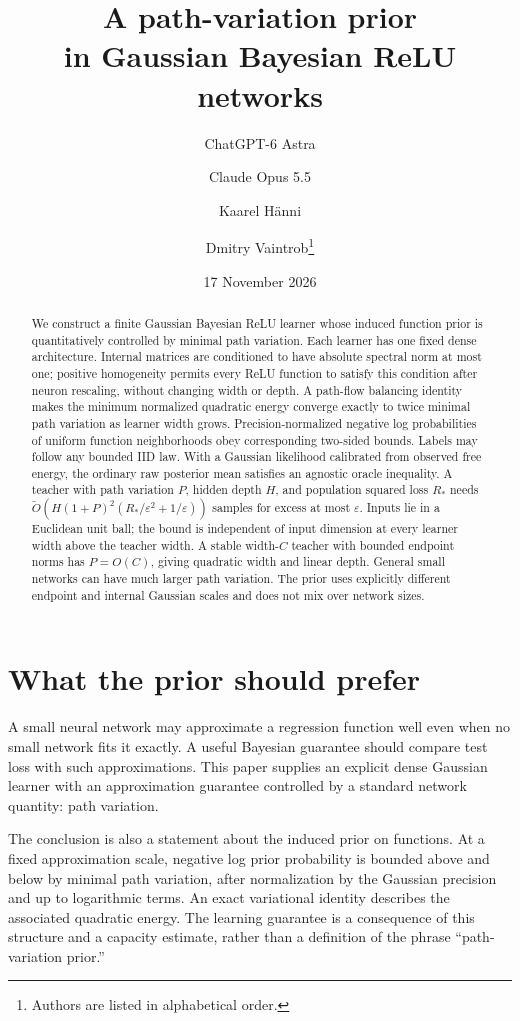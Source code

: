 \documentclass[11pt]{article}
\title{A path-variation prior\\in Gaussian Bayesian ReLU networks}
\author{ChatGPT-6 Astra \and Claude Opus 5.5 \and Kaarel H\"anni \and Dmitry Vaintrob\thanks{Authors are listed in alphabetical order.}}
\date{17 November 2026}
\theoremstyle{definition}\newtheorem{definition}[theorem]{Definition}
\theoremstyle{remark}\newtheorem{remark}[theorem]{Remark}
\begin{document}
\maketitle
\begin{abstract}
We construct a finite Gaussian Bayesian ReLU learner whose induced function prior is quantitatively controlled by minimal path variation. Each learner has one fixed dense architecture. Internal matrices are conditioned to have absolute spectral norm at most one; positive homogeneity permits every ReLU function to satisfy this condition after neuron rescaling, without changing width or depth. A path-flow balancing identity makes the minimum normalized quadratic energy converge exactly to twice minimal path variation as learner width grows. Precision-normalized negative log probabilities of uniform function neighborhoods obey corresponding two-sided bounds. Labels may follow any bounded IID law. With a Gaussian likelihood calibrated from observed free energy, the ordinary raw posterior mean satisfies an agnostic oracle inequality. A teacher with path variation $P$, hidden depth $H$, and population squared loss $R_*$ needs $\widetilde O(H(1+P)^2(R_*/\varepsilon^2+1/\varepsilon))$ samples for excess at most $\varepsilon$. Inputs lie in a Euclidean unit ball; the bound is independent of input dimension at every learner width above the teacher width. A stable width-$C$ teacher with bounded endpoint norms has $P=O(C)$, giving quadratic width and linear depth. General small networks can have much larger path variation. The prior uses explicitly different endpoint and internal Gaussian scales and does not mix over network sizes.
\end{abstract}

\section{What the prior should prefer}
A small neural network may approximate a regression function well even when no small network fits it exactly. A useful Bayesian guarantee should compare test loss with such approximations. This paper supplies an explicit dense Gaussian learner with an approximation guarantee controlled by a standard network quantity: path variation.

The conclusion is also a statement about the induced prior on functions. At a fixed approximation scale, negative log prior probability is bounded above and below by minimal path variation, after normalization by the Gaussian precision and up to logarithmic terms. An exact variational identity describes the associated quadratic energy. The learning guarantee is a consequence of this structure and a capacity estimate, rather than a definition of the phrase ``path-variation prior.''
\end{document}
